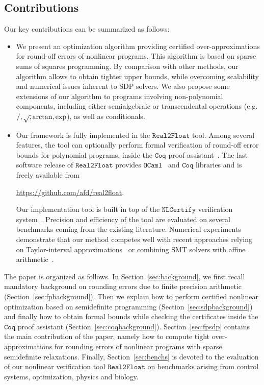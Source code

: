 \documentclass[a4paper,10pt]{article}
\newcommand{\realtofloat}{\mathtt{Real2Float}}
\newcommand{\ocaml}{\mathtt{OCaml}}
\newcommand{\coq}{\mathtt{Coq}}
\newcommand{\nlcertify}{\mathtt{NLCertify}}
\theoremstyle{plain}
\theoremstyle{definition}
\theoremstyle{remark}
\begin{document}
\subsection{Contributions}
Our key contributions can be summarized as follows:
\begin{itemize}
\item We present an optimization algorithm providing certified over-approximations for round-off errors of nonlinear programs. This algorithm is based on sparse sums of squares programming. By comparison with other methods, our algorithm allows to obtain tighter upper bounds, while overcoming scalability and numerical issues inherent to SDP solvers. We also propose some extensions of our algorithm to programs involving non-polynomial components, including either semialgebraic or transcendental operations (e.g. $/, \sqrtsign, \arctan, \exp$), as well as conditionals.
\item Our framework is fully implemented in the $\realtofloat$ tool.  Among several features, the tool can optionally perform formal verification of round-off error bounds for polynomial programs, inside the $\coq$ proof assistant~\cite{CoqProofAssistant}. The last software release of $\realtofloat$ provides $\ocaml$~\cite{OCaml} and $\coq$ libraries and is freely available from 
\begin{center}
\url{https://github.com/afd/real2float}.
\end{center}
%
Our implementation tool is built in top of the $\nlcertify$ verification system~\cite{icms14}. Precision and efficiency of the tool are evaluated on several benchmarks coming from the existing literature. Numerical experiments demonstrate that our method competes well with recent approaches relying on Taylor-interval approximations~\cite{Darulova14Popl} or combining SMT solvers with affine arithmetic~\cite{Darulova14Popl}.
\end{itemize}
%


The paper is organized as follows.
%
In Section~\ref{sec:background}, we first recall mandatory background on rounding errors due to finite precision arithmetic (Section~\ref{sec:fpbackground}). Then we explain how to perform certified nonlinear optimization based on semidefinite programming (Section~\ref{sec:sdpbackground}) and finally how to obtain formal bounds while checking the certificates inside the $\coq$ proof assistant (Section~\ref{sec:coqbackground}).
%
Section~\ref{sec:fpsdp} contains the main contribution of the paper, namely how to compute tight over-approximations for rounding errors of nonlinear programs with sparse semidefinite relaxations.
%
Finally, Section~\ref{sec:benchs} is devoted to the evaluation of our nonlinear verification tool $\realtofloat$ on benchmarks arising from control systems, optimization, physics and biology.
\end{document}
